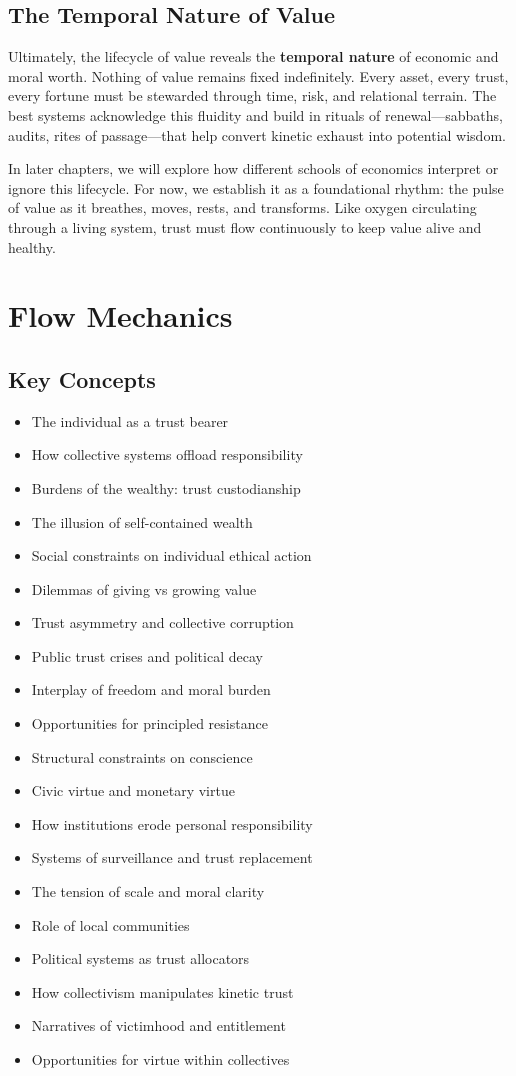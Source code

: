 \documentclass[11pt,oneside]{book}
\begin{document}
\section{The Temporal Nature of Value}

Ultimately, the lifecycle of value reveals the \textbf{temporal nature} of economic and moral worth. Nothing of value remains fixed indefinitely. Every asset, every trust, every fortune must be stewarded through time, risk, and relational terrain. The best systems acknowledge this fluidity and build in rituals of renewal—sabbaths, audits, rites of passage—that help convert kinetic exhaust into potential wisdom.

In later chapters, we will explore how different schools of economics interpret or ignore this lifecycle. For now, we establish it as a foundational rhythm: the pulse of value as it breathes, moves, rests, and transforms. Like oxygen circulating through a living system, trust must flow continuously to keep value alive and healthy.


\chapter{ Flow Mechanics}

\section{Key Concepts}

\begin{itemize}
\item The individual as a trust bearer
\item How collective systems offload responsibility
\item Burdens of the wealthy: trust custodianship
\item The illusion of self-contained wealth
\item Social constraints on individual ethical action
\item Dilemmas of giving vs growing value
\item Trust asymmetry and collective corruption
\item Public trust crises and political decay
\item Interplay of freedom and moral burden
\item Opportunities for principled resistance
\item Structural constraints on conscience
\item Civic virtue and monetary virtue
\item How institutions erode personal responsibility
\item Systems of surveillance and trust replacement
\item The tension of scale and moral clarity
\item Role of local communities
\item Political systems as trust allocators
\item How collectivism manipulates kinetic trust
\item Narratives of victimhood and entitlement
\item Opportunities for virtue within collectives
\end{itemize}
\end{document}
